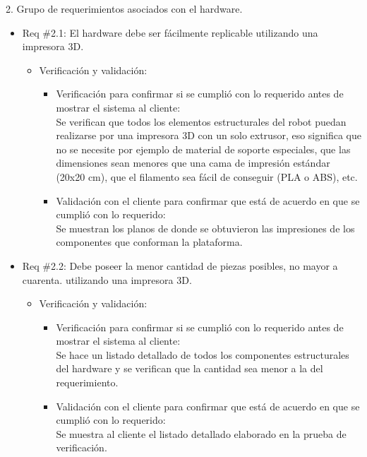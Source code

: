 \documentclass[
11pt, %
codirector, %
]{charter}
\begin{document}
2. Grupo de requerimientos asociados con el hardware.

\begin{itemize}
\item Req \#2.1: El hardware debe ser fácilmente replicable utilizando una impresora 3D.
\begin{itemize}
\item Verificación y validación:
	\begin{itemize}
	\item Verificación para confirmar si se cumplió con lo requerido 	antes de mostrar el sistema al cliente:\\
	Se verifican que todos los elementos estructurales del
 	robot puedan realizarse por una impresora 3D con un solo 
 	extrusor, eso significa que no se necesite por ejemplo de
 	material de soporte	especiales, que las dimensiones sean
 	menores que una cama de impresión estándar (20x20 cm), 
 	que el filamento sea fácil de conseguir (PLA o ABS), etc.
	\item Validación con el cliente para confirmar que está de 				acuerdo en que se cumplió con lo requerido:\\
	Se muestran los planos de donde se obtuvieron las impresiones de 
	los componentes  que conforman la plataforma.    
	\end{itemize}
\end{itemize}
\end{itemize}

\begin{itemize}
\item Req \#2.2: Debe poseer la menor cantidad de piezas posibles, no mayor a cuarenta. utilizando una impresora 3D.
\begin{itemize}
\item Verificación y validación:
	\begin{itemize}
	\item Verificación para confirmar si se cumplió con lo requerido 	antes de mostrar el sistema al cliente:\\
	Se hace un listado detallado de todos los componentes
	estructurales del hardware y se verifican que la cantidad sea 
	menor a la del requerimiento.
	\item Validación con el cliente para confirmar que está de 				acuerdo en que se cumplió con lo requerido:\\
	Se muestra al cliente el listado detallado elaborado en la
	 prueba de verificación. 
	\end{itemize}
\end{itemize}
\end{itemize}
\end{document}
